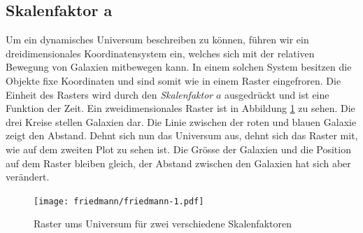 \begin{refsection}
\section{Skalenfaktor a\label{Section:Skalenfaktor}}
Um ein dynamisches Universum beschreiben zu können, führen wir ein dreidimensionales Koordinatensystem ein, welches sich mit der relativen Bewegung von Galaxien mitbewegen kann. In einem solchen System besitzen die Objekte fixe Koordinaten und sind somit wie in einem Raster eingefroren. Die Einheit des Rasters wird durch den {\em Skalenfaktor} $a$ ausgedrückt und ist eine Funktion der Zeit. Ein zweidimensionales Raster ist in Abbildung \ref{friedmann:friedmannRaster} zu sehen. Die drei Kreise stellen Galaxien dar. Die Linie zwischen der roten und blauen Galaxie zeigt den Abstand. Dehnt sich nun das Universum aus, dehnt sich das Raster mit, wie auf dem zweiten Plot zu sehen ist. Die Grösse der Galaxien und die Position auf dem Raster bleiben gleich, der Abstand zwischen den Galaxien hat sich aber verändert. 

\begin{figure}
	\centering
	\texttt{[image: friedmann/friedmann-1.pdf]}
	\caption{Raster ums Universum für zwei verschiedene Skalenfaktoren}
	\label{friedmann:friedmannRaster}
\end{figure}%

\end{refsection}
